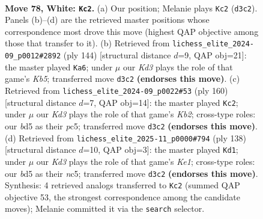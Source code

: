 \documentclass[11pt]{article}
\begin{document}
\clearpage

\begin{figure}[p]\centering
\begin{subfigure}{0.46\textwidth}\centering
\resizebox{\linewidth}{!}{%
\newchessgame
\chessboard[
  setfen={1R6/3k4/8/3b4/1P5r/3K4/8/4R3 w - - 29 78},
  showmover=false,
  pgfstyle=straightmove, color=movearrow, markmove={d3-c2}
]}
\caption{}
\end{subfigure}\hfill
\begin{subfigure}{0.46\textwidth}\centering
\resizebox{\linewidth}{!}{%
\newchessgame
\chessboard[
  setfen={8/2P4R/4k3/1K6/8/8/2r5/8 w - - 3 73},
  showmover=false,
  pgfstyle=straightmove, color=movearrow, markmove={b5-a6}
]}
\caption{}
\end{subfigure}
\\[4pt]
\begin{subfigure}{0.46\textwidth}\centering
\resizebox{\linewidth}{!}{%
\newchessgame
\chessboard[
  setfen={8/P2R4/8/2p5/r7/8/1K6/4k3 w - - 27 81},
  showmover=false,
  pgfstyle=straightmove, color=movearrow, markmove={b2-c2}
]}
\caption{}
\end{subfigure}\hfill
\begin{subfigure}{0.46\textwidth}\centering
\resizebox{\linewidth}{!}{%
\newchessgame
\chessboard[
  setfen={8/8/5R2/2n5/1r3P2/4k3/8/4K3 w - - 1 70},
  showmover=false,
  pgfstyle=straightmove, color=movearrow, markmove={e1-d1}
]}
\caption{}
\end{subfigure}
\caption{\textbf{Move 78, White: \texttt{Kc2}.} (a) Our position; Melanie plays \texttt{Kc2} (\texttt{d3c2}). Panels (b)--(d) are the retrieved master positions whose correspondence most drove this move (highest QAP objective among those that transfer to it). (b) Retrieved from \texttt{lichess\_elite\_2024-09\_p0012\#2892} (ply 144) [structural distance $d$=9, QAP obj=21]: the master played \texttt{Ka6}; under $\mu$ our \emph{Kd3} plays the role of that game's \emph{Kb5}; transferred move \texttt{d3c2} \textbf{(endorses this move)}. (c) Retrieved from \texttt{lichess\_elite\_2024-09\_p0022\#53} (ply 160) [structural distance $d$=7, QAP obj=14]: the master played \texttt{Kc2}; under $\mu$ our \emph{Kd3} plays the role of that game's \emph{Kb2}; cross-type roles: our \emph{b}d5 as their \emph{p}c5; transferred move \texttt{d3c2} \textbf{(endorses this move)}. (d) Retrieved from \texttt{lichess\_elite\_2025-11\_p0000\#794} (ply 138) [structural distance $d$=10, QAP obj=3]: the master played \texttt{Kd1}; under $\mu$ our \emph{Kd3} plays the role of that game's \emph{Ke1}; cross-type roles: our \emph{b}d5 as their \emph{n}c5; transferred move \texttt{d3c2} \textbf{(endorses this move)}. Synthesis: 4 retrieved analogs transferred to \texttt{Kc2} (summed QAP objective 53, the strongest correspondence among the candidate moves); Melanie committed it via the \texttt{search} selector.}
\label{fig:thought-m154}
\end{figure}
\end{document}
